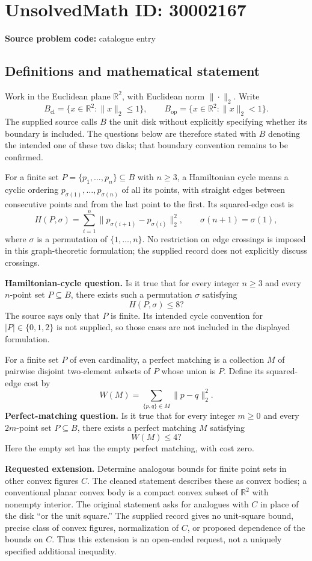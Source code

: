 \documentclass[11pt]{article}
\newcommand{\R}{\mathbb{R}}
\begin{document}
\section*{UnsolvedMath ID: 30002167}
\textbf{Source problem code:} catalogue entry
\subsection{Definitions and mathematical statement}
Work in the Euclidean plane \(\R^2\), with Euclidean norm \(\|\cdot\|_2\). Write
\[
B_{\mathrm{cl}}=\{x\in\R^2:\|x\|_2\leq 1\},\qquad
B_{\mathrm{op}}=\{x\in\R^2:\|x\|_2<1\}.
\]
The supplied source calls \(B\) the unit disk without explicitly specifying whether its boundary is included. The questions below are therefore stated with \(B\) denoting the intended one of these two disks; that boundary convention remains to be confirmed.

For a finite set \(P=\{p_1,\ldots,p_n\}\subseteq B\) with \(n\geq 3\), a Hamiltonian cycle means a cyclic ordering \(p_{\sigma(1)},\ldots,p_{\sigma(n)}\) of all its points, with straight edges between consecutive points and from the last point to the first. Its squared-edge cost is
\[
H(P,\sigma)=\sum_{i=1}^{n}\bigl\|p_{\sigma(i+1)}-p_{\sigma(i)}\bigr\|_2^2,
\qquad \sigma(n+1)=\sigma(1),
\]
where \(\sigma\) is a permutation of \(\{1,\ldots,n\}\). No restriction on edge crossings is imposed in this graph-theoretic formulation; the supplied record does not explicitly discuss crossings.

\textbf{Hamiltonian-cycle question.} Is it true that for every integer \(n\geq 3\) and every \(n\)-point set \(P\subseteq B\), there exists such a permutation \(\sigma\) satisfying
\[
H(P,\sigma)\leq 8?
\]
The source says only that \(P\) is finite. Its intended cycle convention for \(|P|\in\{0,1,2\}\) is not supplied, so those cases are not included in the displayed formulation.

For a finite set \(P\) of even cardinality, a perfect matching is a collection \(M\) of pairwise disjoint two-element subsets of \(P\) whose union is \(P\). Define its squared-edge cost by
\[
W(M)=\sum_{\{p,q\}\in M}\|p-q\|_2^2.
\]
\textbf{Perfect-matching question.} Is it true that for every integer \(m\geq 0\) and every \(2m\)-point set \(P\subseteq B\), there exists a perfect matching \(M\) satisfying
\[
W(M)\leq 4?
\]
Here the empty set has the empty perfect matching, with cost zero.

\textbf{Requested extension.} Determine analogous bounds for finite point sets in other convex figures \(C\). The cleaned statement describes these as convex bodies; a conventional planar convex body is a compact convex subset of \(\R^2\) with nonempty interior. The original statement asks for analogues with \(C\) in place of the disk ``or the unit square.'' The supplied record gives no unit-square bound, precise class of convex figures, normalization of \(C\), or proposed dependence of the bounds on \(C\). Thus this extension is an open-ended request, not a uniquely specified additional inequality.
\end{document}
